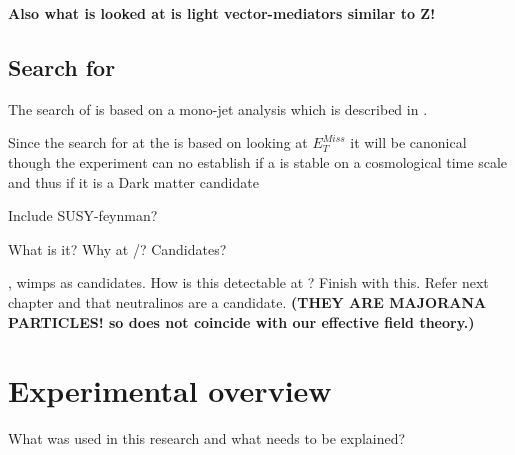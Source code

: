 \textbf{Also what is looked at is light vector-mediators similar to Z!}

\subsection{Search for \abbrWIMPS}\label{sec:tb:subsec:WIMPS}
The search of \abbrWIMPS is based on a mono-jet analysis which is described in . 

Since the search for \abbrWIMPS at the \abbrLHC is based on looking at $E_T^{Miss}$ it will be canonical though the experiment can no establish if a \abbrWIMP is stable on a cosmological time scale and thus if it is a Dark matter candidate \citep{CERN-PH-EP-2012-210}

Include SUSY-feynman?

What is it? Why at \abbrCERN/\abbrATLAS? Candidates?

\abbrWIMPS, wimps as candidates.
How is this detectable at \abbrATLAS? Finish with this. Refer next chapter and that neutralinos are a candidate. \textbf{(THEY ARE MAJORANA PARTICLES! so does not coincide with our effective field theory.)}

\newpage
\section{Experimental overview}\label{sec:experiment}
What was used in this research and what needs to be explained?
